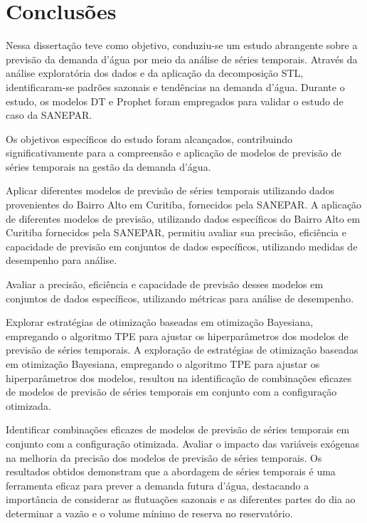 \section{Conclus\~oes} \label{sec:conclusoes}

Nessa dissertação teve como objetivo, conduziu-se um estudo abrangente sobre a previsão da demanda d'água por meio da análise de séries temporais. Através da análise exploratória dos dados e da aplicação da decomposição STL, identificaram-se padrões sazonais e tendências na demanda d'água. Durante o estudo, os modelos DT e Prophet foram empregados para validar o estudo de caso da SANEPAR.

Os objetivos específicos do estudo foram alcançados, contribuindo significativamente para a compreensão e aplicação de modelos de previsão de séries temporais na gestão da demanda d'água.

Aplicar diferentes modelos de previsão de séries temporais utilizando dados provenientes do Bairro Alto em Curitiba, fornecidos pela SANEPAR.
A aplicação de diferentes modelos de previsão, utilizando dados específicos do Bairro Alto em Curitiba fornecidos pela SANEPAR, permitiu avaliar sua precisão, eficiência e capacidade de previsão em conjuntos de dados específicos, utilizando medidas de desempenho para análise.

Avaliar a precisão, eficiência e capacidade de previsão desses modelos em conjuntos de dados específicos, utilizando métricas para análise de desempenho.

Explorar estratégias de otimização baseadas em otimização Bayesiana, empregando o algoritmo TPE para ajustar os hiperparâmetros dos modelos de previsão de séries temporais.
A exploração de estratégias de otimização baseadas em otimização Bayesiana, empregando o algoritmo TPE para ajustar os hiperparâmetros dos modelos, resultou na identificação de combinações eficazes de modelos de previsão de séries temporais em conjunto com a configuração otimizada.

Identificar combinações eficazes de modelos de previsão de séries temporais em conjunto com a configuração otimizada. 
Avaliar o impacto das variáveis exógenas na melhoria da precisão dos modelos de previsão de séries temporais.
Os resultados obtidos demonstram que a abordagem de séries temporais é uma ferramenta eficaz para prever a demanda futura d'água, destacando a importância de considerar as flutuações sazonais e as diferentes partes do dia ao determinar a vazão e o volume mínimo de reserva no reservatório.

